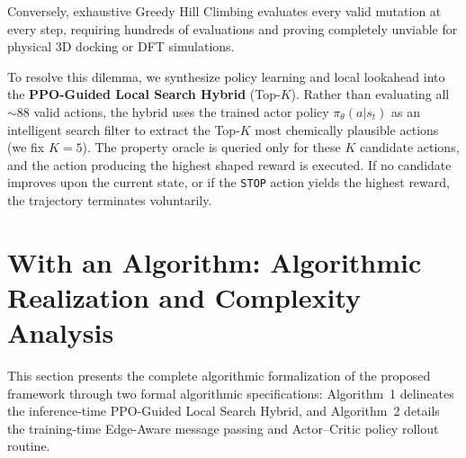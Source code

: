 \documentclass{ieeeaccess}
\begin{document}
Conversely, exhaustive Greedy Hill Climbing evaluates every valid mutation at every step, requiring hundreds of evaluations and proving completely unviable for physical 3D docking or DFT simulations.

To resolve this dilemma, we synthesize policy learning and local lookahead into the \textbf{PPO-Guided Local Search Hybrid} (Top-$K$). Rather than evaluating all $\sim88$ valid actions, the hybrid uses the trained actor policy $\pi_\theta(a|s_t)$ as an intelligent search filter to extract the Top-$K$ most chemically plausible actions (we fix $K=5$). The property oracle is queried only for these $K$ candidate actions, and the action producing the highest shaped reward is executed. If no candidate improves upon the current state, or if the \texttt{STOP} action yields the highest reward, the trajectory terminates voluntarily.


\section{With an Algorithm: Algorithmic Realization and Complexity Analysis}
\label{sec:algorithm}
This section presents the complete algorithmic formalization of the proposed framework through two formal algorithmic specifications: Algorithm~1 delineates the inference-time PPO-Guided Local Search Hybrid, and Algorithm~2 details the training-time Edge-Aware message passing and Actor--Critic policy rollout routine.
\end{document}
